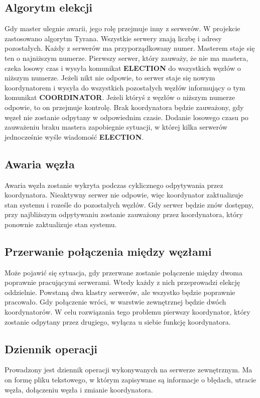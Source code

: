 \subsection{Algorytm elekcji}
Gdy master ulegnie awarii, jego rolę przejmuje inny z serwerów. W projekcie zastosowano algorytm Tyrana.
Wszystkie serwery znają liczbę i adresy pozostałych. Każdy z serwerów ma przyporządkowany numer. Masterem staje się ten o najniższym numerze. Pierwszy serwer, który zauważy, że nie ma mastera, czeka losowy czas i wysyła komunikat \textbf{ELECTION} do wszystkich węzłów o niższym numerze. Jeżeli nikt nie odpowie, to serwer staje się nowym koordynatorem i wysyła do wszystkich pozostałych węzłów informujący o tym komunikat \textbf{COORDINATOR}. Jeżeli któryś z węzłów o niższym numerze odpowie, to on przejmuje kontrolę. Brak koordynatora będzie zauważony, gdy węzeł nie zostanie odpytany w odpowiednim czasie. Dodanie losowego czasu po zauważeniu braku mastera zapobiegnie sytuacji, w której kilka serwerów jednocześnie wyśle wiadomość \textbf{ELECTION}.

\subsection{Awaria węzła}
Awaria węzła zostanie wykryta podczas cyklicznego odpytywania przez koordynatora. Nieaktywny serwer nie odpowie, więc koordynator zaktualizuje stan systemu i roześle do pozostałych węzłów. Gdy serwer będzie znów dostępny, przy najbliższym odpytywaniu zostanie zauważony przez koordynatora, który ponownie zaktualizuje stan systemu.

\subsection{Przerwanie połączenia między węzłami}
Może pojawić się sytuacja, gdy przerwane zostanie połączenie między dwoma poprawnie pracującymi serwerami. Wtedy każdy z nich przeprowadzi elekcję oddzielnie. Powstaną dwa klastry serwerów, ale wszystko będzie poprawnie pracowało. Gdy połączenie wróci, w warstwie zewnętrznej będzie dwóch koordynatorów. W celu rozwiązania tego problemu pierwszy koordynator, który zostanie odpytany przez drugiego, wyłącza u siebie funkcję koordynatora.

\subsection{Dziennik operacji}
Prowadzony jest dziennik operacji wykonywanych na serwerze zewnętrznym. Ma on formę pliku tekstowego, w którym zapisywane są informacje o błędach, utracie węzła, dołączeniu węzła i zmianie koordynatora.


